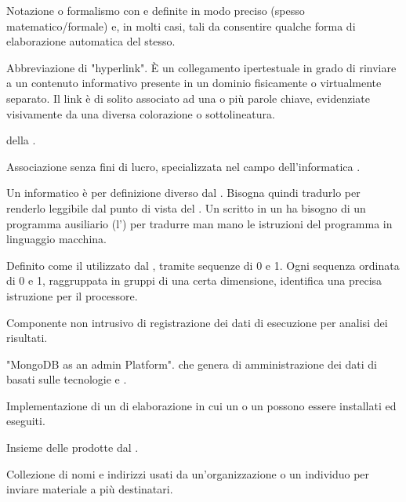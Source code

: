 {Notazione o formalismo con  e  definite in modo preciso (spesso matematico/formale) e, in molti casi, tali da consentire qualche forma di elaborazione automatica del  stesso.}

{Abbreviazione di "hyperlink". \`{E} un collegamento ipertestuale in grado di rinviare a un contenuto informativo presente in un dominio fisicamente o virtualmente separato. Il link è di solito associato ad una o più parole chiave, evidenziate visivamente da una diversa colorazione o sottolineatura.}

{ della .}

{Associazione senza fini di lucro, specializzata nel campo dell'informatica .}

{Un  informatico è per definizione diverso dal . Bisogna quindi tradurlo per renderlo leggibile dal punto di vista del . Un  scritto in un  ha bisogno di un programma ausiliario (l') per tradurre man mano le istruzioni del programma in linguaggio macchina.}

{Definito come il  utilizzato dal , tramite sequenze di 0 e 1. Ogni sequenza ordinata di 0 e 1, raggruppata in gruppi di una certa dimensione, identifica una precisa istruzione per il processore.}

{Componente non intrusivo di registrazione dei dati di esecuzione per analisi dei risultati.}




{"MongoDB as an admin Platform".  che genera   di amministrazione dei dati di  basati sulle tecnologie e .}

{Implementazione  di un  di elaborazione in cui un  o un  possono essere installati ed eseguiti.}

{Insieme delle  prodotte dal  .}

{Collezione di nomi e indirizzi usati da un'organizzazione o un individuo per inviare materiale a più destinatari.}

